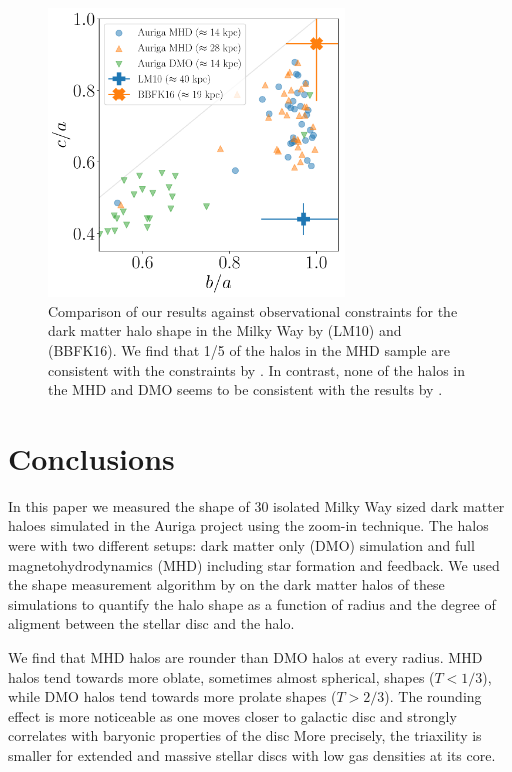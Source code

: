 \documentclass[usenatbib]{mnras}
\begin{document}
\begin{figure}
\begin{center}
\includegraphics[width=0.7\textwidth]{triaxiality_observations.pdf}
\end{center}
\caption{Comparison of our results against 
observational constraints for the 
dark matter halo shape in the Milky Way by \citet{LM10} (LM10) and
\citet{Bovy16} (BBFK16).   
We find that  1/5 of the halos in the MHD  sample are consistent with
the constraints by \citet{Bovy16}.
In contrast, none of the halos in the MHD and DMO seems to be
consistent with the results by \citet{LM10}.}
\label{fig:observations}
\end{figure}

\section{Conclusions}
\label{sec:conclusions}

In this paper we measured the shape of 30 isolated Milky Way sized
dark matter haloes simulated in the Auriga project using the zoom-in
technique. 
The halos were with two different setups:
dark matter only (DMO) simulation and full magnetohydrodynamics (MHD)
including star formation and feedback.
We used the shape measurement algorithm by \cite{Allgood06} on the
dark matter halos of these simulations to quantify the halo shape as a
function of radius and the degree of aligment between the stellar disc
and the halo. 

We find that MHD halos are rounder than DMO halos at every radius.
MHD halos tend towards more oblate, sometimes almost spherical, shapes
($T<1/3$), while DMO halos tend towards more prolate shapes ($T>2/3$).  
The rounding effect is more noticeable as one moves closer to galactic
disc and strongly  correlates with baryonic properties of the disc
More precisely, the triaxility is smaller for extended and massive
stellar discs with low gas densities at its core.
\end{document}
